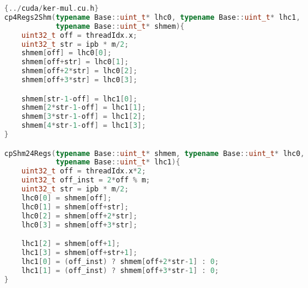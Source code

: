 \begin{lstlisting}[language=CPP,caption={\footnotesize CUDA convolution memory
transactions of \textit{convmul} with sequentialization factor of 4 to prepare
calling \textit{badd} on the four pairs of parts in registers, from file
\texttt{ker-mul.cu.h} (slightly edited), with base class \texttt{Base}, big integer size \texttt{m}, and \texttt{ipb} instances per block.},label={cudamulmem},firstnumber=106]{../cuda/ker-mul.cu.h}
cp4Regs2Shm(typename Base::uint_t* lhc0, typename Base::uint_t* lhc1,
            typename Base::uint_t* shmem){
    uint32_t off = threadIdx.x;
    uint32_t str = ipb * m/2;
    shmem[off] = lhc0[0];
    shmem[off+str] = lhc0[1];
    shmem[off+2*str] = lhc0[2];
    shmem[off+3*str] = lhc0[3];

    shmem[str-1-off] = lhc1[0];
    shmem[2*str-1-off] = lhc1[1];
    shmem[3*str-1-off] = lhc1[2];
    shmem[4*str-1-off] = lhc1[3];
}

cpShm24Regs(typename Base::uint_t* shmem, typename Base::uint_t* lhc0,
            typename Base::uint_t* lhc1){
    uint32_t off = threadIdx.x*2;
    uint32_t off_inst = 2*off % m;
    uint32_t str = ipb * m/2;
    lhc0[0] = shmem[off];
    lhc0[1] = shmem[off+str];
    lhc0[2] = shmem[off+2*str];
    lhc0[3] = shmem[off+3*str];

    lhc1[2] = shmem[off+1];
    lhc1[3] = shmem[off+str+1];
    lhc1[0] = (off_inst) ? shmem[off+2*str-1] : 0;
    lhc1[1] = (off_inst) ? shmem[off+3*str-1] : 0;
}
\end{lstlisting}


